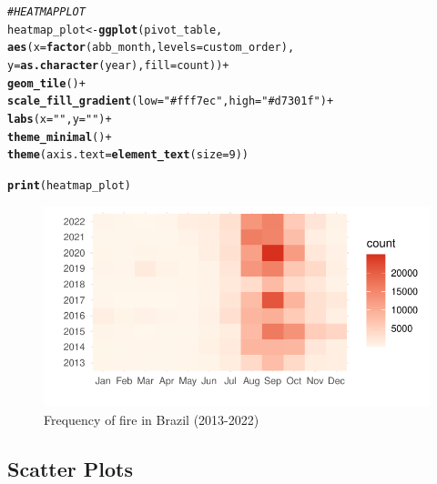 \documentclass{article}\usepackage[]{graphicx}\usepackage[]{xcolor}
\makeatletter
\def\maxwidth{ %
  \ifdim\Gin@nat@width>\linewidth
    \linewidth
  \else
    \Gin@nat@width
  \fi
}
\newcommand{\hlnum}[1]{\textcolor[rgb]{0.686,0.059,0.569}{#1}}%
\newcommand{\hlstr}[1]{\textcolor[rgb]{0.192,0.494,0.8}{#1}}%
\newcommand{\hlcom}[1]{\textcolor[rgb]{0.678,0.584,0.686}{\textit{#1}}}%
\newcommand{\hlopt}[1]{\textcolor[rgb]{0,0,0}{#1}}%
\newcommand{\hlstd}[1]{\textcolor[rgb]{0.345,0.345,0.345}{#1}}%
\newcommand{\hlkwb}[1]{\textcolor[rgb]{0.69,0.353,0.396}{#1}}%
\newcommand{\hlkwc}[1]{\textcolor[rgb]{0.333,0.667,0.333}{#1}}%
\newcommand{\hlkwd}[1]{\textcolor[rgb]{0.737,0.353,0.396}{\textbf{#1}}}%
\newenvironment{kframe}{%
 \def\at@end@of@kframe{}%
 \ifinner\ifhmode%
  \def\at@end@of@kframe{\end{minipage}}%
  \begin{minipage}{\columnwidth}%
 \fi\fi%
 \def\FrameCommand##1{\hskip\@totalleftmargin \hskip-\fboxsep
 \colorbox{shadecolor}{##1}\hskip-\fboxsep
     \hskip-\linewidth \hskip-\@totalleftmargin \hskip\columnwidth}%
 \MakeFramed {\advance\hsize-\width
   \@totalleftmargin\z@ \linewidth\hsize
   \@setminipage}}%
 {\par\unskip\endMakeFramed%
 \at@end@of@kframe}
\newenvironment{knitrout}{}{} %
\numberwithin{equation}{section}
\makeatother
\begin{document}
\begin{knitrout}\scriptsize
{}\color{fgcolor}\begin{kframe}
\begin{alltt}
\hlcom{# HEATMAP PLOT}
\hlstd{heatmap_plot} \hlkwb{<-} \hlkwd{ggplot}\hlstd{(pivot_table,}
                       \hlkwd{aes}\hlstd{(}\hlkwc{x} \hlstd{=} \hlkwd{factor}\hlstd{(abb_month,} \hlkwc{levels} \hlstd{= custom_order),}
                           \hlkwc{y} \hlstd{=} \hlkwd{as.character}\hlstd{(year),} \hlkwc{fill} \hlstd{= count))} \hlopt{+}
  \hlkwd{geom_tile}\hlstd{()} \hlopt{+}
  \hlkwd{scale_fill_gradient}\hlstd{(}\hlkwc{low} \hlstd{=} \hlstr{"#fff7ec"}\hlstd{,} \hlkwc{high} \hlstd{=} \hlstr{"#d7301f"}\hlstd{)} \hlopt{+}
  \hlkwd{labs}\hlstd{(}\hlkwc{x} \hlstd{=} \hlstr{" "}\hlstd{,} \hlkwc{y} \hlstd{=} \hlstr{" "}\hlstd{)} \hlopt{+}
  \hlkwd{theme_minimal}\hlstd{()} \hlopt{+}
  \hlkwd{theme}\hlstd{(}\hlkwc{axis.text} \hlstd{=} \hlkwd{element_text}\hlstd{(}\hlkwc{size} \hlstd{=} \hlnum{9}\hlstd{))}

\hlkwd{print}\hlstd{(heatmap_plot)}
\end{alltt}
\end{kframe}\begin{figure}[H]

{\centering \includegraphics[width=\maxwidth]{figure/beamer-fire-by-months-fy13-22-1} 

}

\caption[Frequency of fire in Brazil (2013-2022)]{Frequency of fire in Brazil (2013-2022)}\label{fig:fire-by-months-fy13-22}
\end{figure}

\end{knitrout}

\subsection{Scatter Plots}
\end{document}
